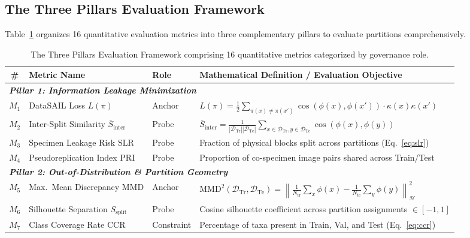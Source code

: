 \documentclass[a4paper,fleqn]{cas-sc}
\begin{document}
\subsection{The Three Pillars Evaluation Framework}
Table~\ref{tab:three_pillars} organizes 16 quantitative evaluation metrics into three complementary pillars to evaluate partitions comprehensively.

\begin{table}[pos=htbp]
\centering
\small
\setlength{\tabcolsep}{4pt}
\renewcommand{\arraystretch}{1.22}
\caption{The Three Pillars Evaluation Framework comprising 16 quantitative metrics categorized by governance role.}
\label{tab:three_pillars}
\begin{tabular}{cllp{8.2cm}}
\toprule
\textbf{\#} & \textbf{Metric Name} & \textbf{Role} & \textbf{Mathematical Definition / Evaluation Objective} \\
\midrule
\multicolumn{4}{l}{\textit{\textbf{Pillar 1: Information Leakage Minimization}}} \\
$M_1$ & DataSAIL Loss $L(\pi)$ & Anchor & $\displaystyle L(\pi) = \frac{1}{2} \sum_{\pi(x) \neq \pi(x')} \cos(\phi(x), \phi(x')) \cdot \kappa(x) \kappa(x')$ \\
$M_2$ & Inter-Split Similarity $\bar{S}_{\text{inter}}$ & Probe & $\displaystyle \bar{S}_{\text{inter}} = \frac{1}{|\mathcal{D}_{\text{Tr}}| |\mathcal{D}_{\text{Te}}|} \sum_{x \in \mathcal{D}_{\text{Tr}}, y \in \mathcal{D}_{\text{Te}}} \cos(\phi(x), \phi(y))$ \\
$M_3$ & Specimen Leakage Risk $\mathrm{SLR}$ & Probe & Fraction of physical blocks split across partitions (Eq.~\ref{eq:slr}) \\
$M_4$ & Pseudoreplication Index $\mathrm{PRI}$ & Probe & Proportion of co-specimen image pairs shared across Train/Test \\
\midrule
\multicolumn{4}{l}{\textit{\textbf{Pillar 2: Out-of-Distribution \& Partition Geometry}}} \\
$M_5$ & Max.\ Mean Discrepancy $\mathrm{MMD}$ & Anchor & $\displaystyle \mathrm{MMD}^2(\mathcal{D}_{\text{Tr}}, \mathcal{D}_{\text{Te}}) = \left\| \frac{1}{N_{\text{tr}}} \sum_{x} \phi(x) - \frac{1}{N_{\text{te}}} \sum_{y} \phi(y) \right\|_{\mathcal{H}}^2$ \\
$M_6$ & Silhouette Separation $S_{\text{split}}$ & Probe & Cosine silhouette coefficient across partition assignments $\in [-1, 1]$ \\
$M_7$ & Class Coverage Rate $\mathrm{CCR}$ & Constraint & Percentage of taxa present in Train, Val, and Test (Eq.~\ref{eq:ccr}) \\

\end{tabular}
\end{table}
\end{document}
